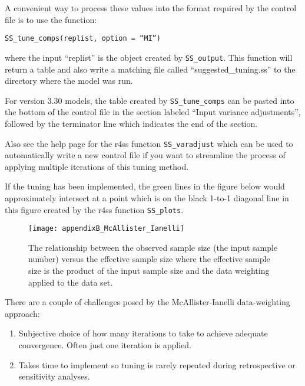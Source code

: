 A convenient way to process these values into the format required by the control file is to use the function:

\texttt{SS\_tune\_comps(replist, option = ``MI'')}

where the input ``replist'' is the object created by \texttt{SS\_output}. This function will return a table and also write a matching file called ``suggested\_tuning.ss'' to the directory where the model was run.

For version 3.30 models, the table created by \texttt{SS\_tune\_comps} can be pasted into the bottom of the control file in the section labeled ``Input variance adjustments'', followed by the terminator line which indicates the end of the section. 


Also see the help page for the r4ss function \texttt{SS\_varadjust} which can be used to automatically write a new control file if you want to streamline the process of applying multiple iterations of this tuning method.

If the tuning has been implemented, the green lines in the figure below would approximately intersect at a point which is on the black 1-to-1 diagonal line in this figure created by the r4ss function \texttt{SS\_plots}.

\begin{figure}[ht]
	\begin{center}
		\texttt{[image: appendixB\_McAllister\_Ianelli]}\\
	\end{center}

	\caption{The relationship between the observed sample size (the input sample number) versus the effective sample size where the effective sample size is the product of the input sample size and the data weighting applied to the data set.}
	\label{(fig:mcallister)}
\end{figure}

There are a couple of challenges posed by the McAllister-Ianelli data-weighting approach:
\begin{enumerate}
	\item Subjective choice of how many iterations to take to achieve adequate convergence. Often just one iteration is applied.
	
	\item Takes time to implement so tuning is rarely repeated during retrospective or sensitivity analyses.
\end{enumerate}

\hypertarget{Francis}{}

